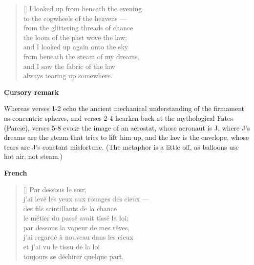\documentclass[a4paper,12pt,twoside,final]{book}
\begin{document}
\newpage



\settowidth{\versewidth}{from under the steam of my dreams,}

\begin{verse}[\versewidth]
  I looked up from beneath the evening \\
  to the cogwheels of the heavens --- \\
  from the glittering threads of chance \\
  the loom of the past wove the law; \\
  and I looked up again onto the sky \\
  from beneath the steam of my dreams, \\
  and I saw the fabric of the law \\
  always tearing up somewhere. \\
\end{verse}

\bigskip

\noindent \textbf{Cursory remark}

\medskip

Whereas verses 1-2 echo the ancient mechanical understanding of the
firmament as concentric spheres, and verses 2-4 hearken back at the
mythological Fates (Parc\ae), verses 5-8 evoke the image of an
aerostat, whose aeronaut is J, where J's dreams are the steam that
tries to lift him up, and the law is the envelope, whose tears are J's
constant misfortune. (The metaphor is a little off, as balloons use
hot air, not steam.)

\bigskip

\noindent \textbf{French}


\settowidth{\versewidth}{j'ai levé les yeux aux rouages des cieux ---}

\begin{verse}[\versewidth]
  Par dessous le soir, \\
  j'ai levé les yeux aux rouages des cieux --- \\
  des fils scintillants de la chance \\
  le métier du passé avait tissé la loi; \\
  par dessous la vapeur de mes rêves, \\
  j'ai regardé à nouveau dans les cieux \\
  et j'ai vu le tissu de la loi \\
  toujours se déchirer quelque part. \\
\end{verse}
\end{document}
